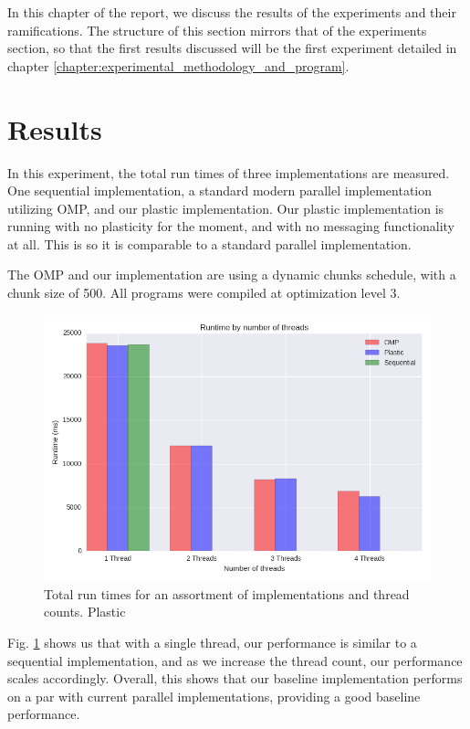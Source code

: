 

In this chapter of the report, we discuss the results of the experiments and their ramifications. The structure of this section mirrors that of the experiments section, so that the first results discussed will be the first experiment detailed in chapter \ref{chapter:experimental_methodology_and_program}.

\section{Results}

In this experiment, the total run times of three implementations are measured. One sequential implementation, a standard modern parallel implementation utilizing OMP, and our plastic implementation. Our plastic implementation is running with no plasticity for the moment, and with no messaging functionality at all. This is so it is comparable to a standard parallel implementation.

The OMP and our implementation are using a dynamic chunks schedule, with a chunk size of 500. All programs were compiled at optimization level 3.

\begin{figure}
	\includegraphics[width=1\textwidth]{graphics/runtime_by_number_of_threads.png}
	\caption{Total run times for an assortment of implementations and thread counts. Plastic }
	\label{fig:runtimes}
\end{figure}

Fig. \ref{fig:runtimes} shows us that with a single thread, our performance is similar to a sequential implementation, and as we increase the thread count, our performance scales accordingly. Overall, this shows that our baseline implementation performs on a par with current parallel implementations, providing a good baseline performance. 

